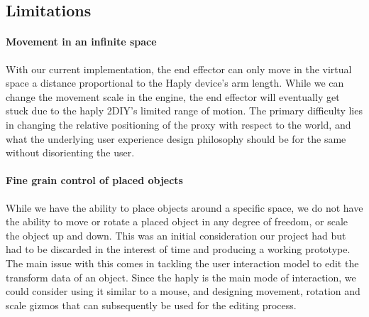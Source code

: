 \subsection{Limitations}

\paragraph{Movement in an infinite space}

With our current implementation, the end effector can only move in the virtual space a distance proportional to the Haply device's arm length. While we can change the movement scale in the engine, the end effector will eventually get stuck due to the haply 2DIY's limited range of motion. The primary difficulty lies in changing the relative positioning of the proxy with respect to the world, and what the underlying user experience design philosophy should be for the same without disorienting the user.

\paragraph{Fine grain control of placed objects}
While we have the ability to place objects around a specific space, we do not have the ability to move or rotate a placed object in any degree of freedom, or scale the object up and down. This was an initial consideration our project had but had to be discarded in the interest of time and producing a working prototype. The main issue with this comes in tackling the user interaction model to edit the transform data of an object. Since the haply is the main mode of interaction, we could consider using it similar to a mouse, and designing movement, rotation and scale gizmos that can subsequently be used for the editing process.
